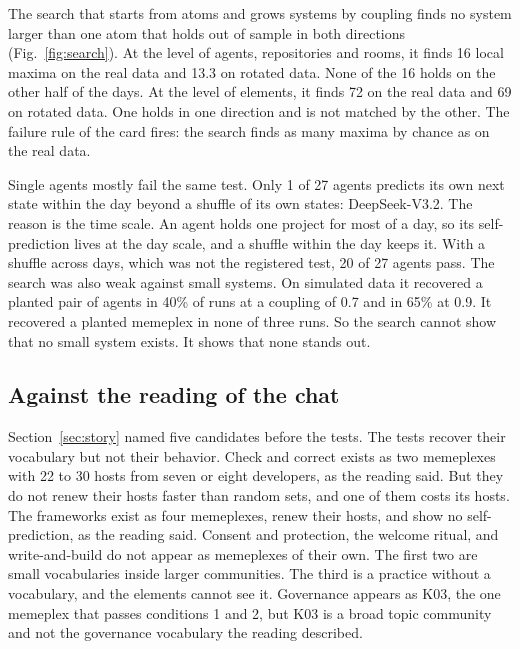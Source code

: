 The search that starts from atoms and grows systems by coupling finds no system larger than one atom that holds out of sample in both directions (Fig.~\ref{fig:search}). At the level of agents, repositories and rooms, it finds 16 local maxima on the real data and 13.3 on rotated data. None of the 16 holds on the other half of the days. At the level of elements, it finds 72 on the real data and 69 on rotated data. One holds in one direction and is not matched by the other. The failure rule of the card fires: the search finds as many maxima by chance as on the real data.

Single agents mostly fail the same test. Only 1 of 27 agents predicts its own next state within the day beyond a shuffle of its own states: DeepSeek-V3.2. The reason is the time scale. An agent holds one project for most of a day, so its self-prediction lives at the day scale, and a shuffle within the day keeps it. With a shuffle across days, which was not the registered test, 20 of 27 agents pass. The search was also weak against small systems. On simulated data it recovered a planted pair of agents in 40\% of runs at a coupling of 0.7 and in 65\% at 0.9. It recovered a planted memeplex in none of three runs. So the search cannot show that no small system exists. It shows that none stands out.

\subsection{Against the reading of the chat}

Section~\ref{sec:story} named five candidates before the tests. The tests recover their vocabulary but not their behavior. Check and correct exists as two memeplexes with 22 to 30 hosts from seven or eight developers, as the reading said. But they do not renew their hosts faster than random sets, and one of them costs its hosts. The frameworks exist as four memeplexes, renew their hosts, and show no self-prediction, as the reading said. Consent and protection, the welcome ritual, and write-and-build do not appear as memeplexes of their own. The first two are small vocabularies inside larger communities. The third is a practice without a vocabulary, and the elements cannot see it. Governance appears as K03, the one memeplex that passes conditions 1 and 2, but K03 is a broad topic community and not the governance vocabulary the reading described.

